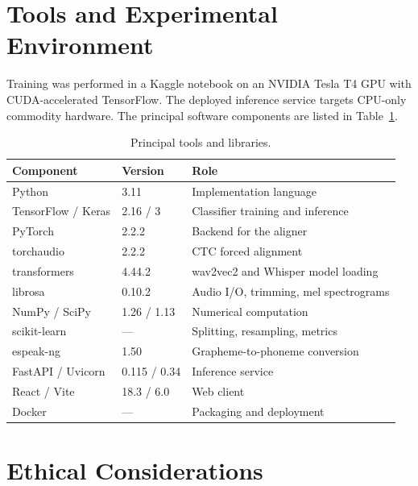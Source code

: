 \section{Tools and Experimental Environment}
\label{sec:tools}

Training was performed in a Kaggle notebook on an NVIDIA Tesla T4 GPU with
CUDA-accelerated TensorFlow. The deployed inference service targets CPU-only
commodity hardware. The principal software components are listed in
Table~\ref{tab:tools}.

\begin{table}[H]
\centering
\caption[Tools and libraries]{Principal tools and libraries.}
\label{tab:tools}
\begin{tabular}{@{}llp{6.0cm}@{}}
\toprule
\textbf{Component} & \textbf{Version} & \textbf{Role} \\
\midrule
Python              & 3.11            & Implementation language \\
TensorFlow / Keras  & 2.16 / 3        & Classifier training and inference \\
PyTorch             & 2.2.2           & Backend for the aligner \\
torchaudio          & 2.2.2           & CTC forced alignment \\
transformers        & 4.44.2          & wav2vec2 and Whisper model loading \\
librosa             & 0.10.2          & Audio I/O, trimming, mel spectrograms \\
NumPy / SciPy       & 1.26 / 1.13     & Numerical computation \\
scikit-learn        & ---             & Splitting, resampling, metrics \\
espeak-ng           & 1.50            & Grapheme-to-phoneme conversion \\
FastAPI / Uvicorn   & 0.115 / 0.34    & Inference service \\
React / Vite        & 18.3 / 6.0      & Web client \\
Docker              & ---             & Packaging and deployment \\
\bottomrule
\end{tabular}
\end{table}

\section{Ethical Considerations}
\label{sec:ethics}

